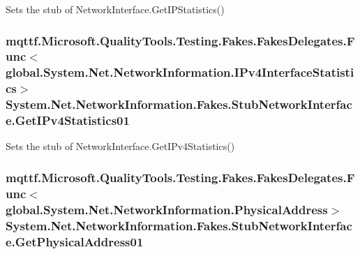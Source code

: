 Sets the stub of Network\-Interface.\-Get\-I\-P\-Statistics()

\hypertarget{class_system_1_1_net_1_1_network_information_1_1_fakes_1_1_stub_network_interface_a692726c4e07ccec7d6c4255a8ddce1e8}{
\subsubsection[{Get\-I\-Pv4\-Statistics01}]{\setlength{\rightskip}{0pt plus 5cm}mqttf.\-Microsoft.\-Quality\-Tools.\-Testing.\-Fakes.\-Fakes\-Delegates.\-Func$<$global.\-System.\-Net.\-Network\-Information.\-I\-Pv4\-Interface\-Statistics$>$ System.\-Net.\-Network\-Information.\-Fakes.\-Stub\-Network\-Interface.\-Get\-I\-Pv4\-Statistics01}}\label{class_system_1_1_net_1_1_network_information_1_1_fakes_1_1_stub_network_interface_a692726c4e07ccec7d6c4255a8ddce1e8}


Sets the stub of Network\-Interface.\-Get\-I\-Pv4\-Statistics()

\hypertarget{class_system_1_1_net_1_1_network_information_1_1_fakes_1_1_stub_network_interface_aef92183142d34822466f871e4b87c0fa}{
\subsubsection[{Get\-Physical\-Address01}]{\setlength{\rightskip}{0pt plus 5cm}mqttf.\-Microsoft.\-Quality\-Tools.\-Testing.\-Fakes.\-Fakes\-Delegates.\-Func$<$global.\-System.\-Net.\-Network\-Information.\-Physical\-Address$>$ System.\-Net.\-Network\-Information.\-Fakes.\-Stub\-Network\-Interface.\-Get\-Physical\-Address01}}\label{class_system_1_1_net_1_1_network_information_1_1_fakes_1_1_stub_network_interface_aef92183142d34822466f871e4b87c0fa}


